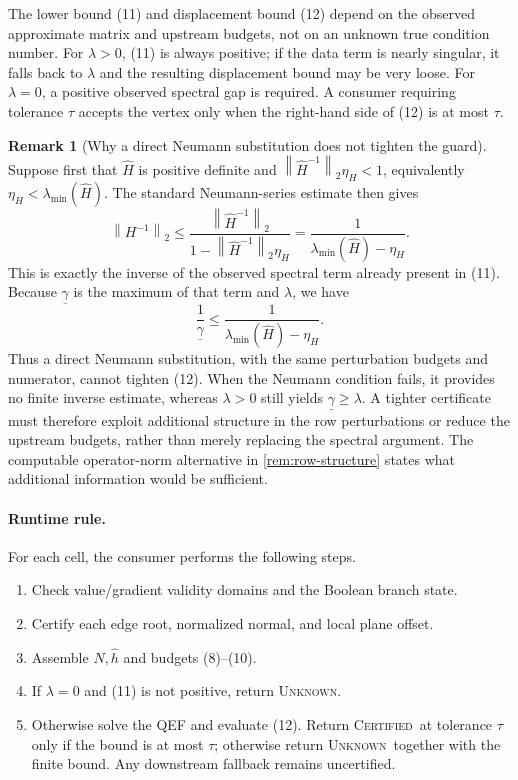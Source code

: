 \documentclass[11pt]{article}
\theoremstyle{definition}
\newtheorem{remark}[theorem]{Remark}
\newcommand{\norm}[1]{\left\lVert#1\right\rVert}
\newcommand{\Certified}{\textsc{Certified}}
\newcommand{\Unknown}{\textsc{Unknown}}
\begin{document}
The lower bound (11) and displacement bound (12) depend on the observed
approximate matrix and upstream budgets, not on an unknown true condition
number.  For \(\lambda>0\), (11) is always positive; if the data term is nearly
singular, it falls back to \(\lambda\) and the resulting displacement bound may
be very loose.  For \(\lambda=0\), a positive observed spectral gap is required.
A consumer requiring tolerance \(\tau\) accepts the vertex only when the
right-hand side of (12) is at most \(\tau\).

\begin{remark}[Why a direct Neumann substitution does not tighten the guard]
\label{rem:neumann}
Suppose first that \(\widehat H\) is positive definite and
\(\norm{\widehat H^{-1}}_2\eta_H<1\), equivalently
\(\eta_H<\lambda_{\min}(\widehat H)\).  The standard Neumann-series estimate
then gives
\[
\norm{H^{-1}}_2
\le
\frac{\norm{\widehat H^{-1}}_2}
{1-\norm{\widehat H^{-1}}_2\eta_H}
=\frac{1}{\lambda_{\min}(\widehat H)-\eta_H}.
\]
This is exactly the inverse of the observed spectral term already present in
(11).  Because \(\underline\gamma\) is the maximum of that term and
\(\lambda\), we have
\[
\frac{1}{\underline\gamma}
\le
\frac{1}{\lambda_{\min}(\widehat H)-\eta_H}.
\]
Thus a direct Neumann substitution, with the same perturbation budgets and
numerator, cannot tighten (12).  When the Neumann condition fails, it provides
no finite inverse estimate, whereas \(\lambda>0\) still yields
\(\underline\gamma\ge\lambda\).  A tighter certificate must therefore exploit
additional structure in the row perturbations or reduce the upstream budgets,
rather than merely replacing the spectral argument.  The computable
operator-norm alternative in \cref{rem:row-structure} states what additional
information would be sufficient.
\end{remark}

\paragraph{Runtime rule.}
For each cell, the consumer performs the following steps.
\begin{enumerate}[leftmargin=*,itemsep=1pt]
\item Check value/gradient validity domains and the Boolean branch state.
\item Certify each edge root, normalized normal, and local plane offset.
\item Assemble \(\widehat N,\widehat h\) and budgets (8)--(10).
\item If \(\lambda=0\) and (11) is not positive, return \Unknown.
\item Otherwise solve the QEF and evaluate (12).  Return \Certified\ at
tolerance \(\tau\) only if the bound is at most \(\tau\); otherwise return
\Unknown\ together with the finite bound.  Any downstream fallback remains
uncertified.
\end{enumerate}
\end{document}
